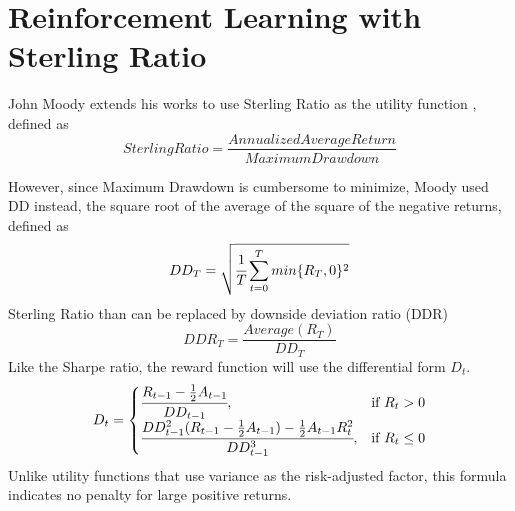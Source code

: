 \section{Reinforcement Learning with Sterling Ratio}
John Moody extends his works to use  Sterling Ratio as the utility function \cite{moody1998performance}, defined as 
\[
Sterling Ratio=\frac{Annualized Average Return}{Maximum Drawdown}
\]

However, since Maximum Drawdown is cumbersome to minimize, Moody used DD instead, the square root of the average of the
square of the negative returns, defined as
\[
DD_T = \sqrt{\cfrac{1}{T}\sum_{t=0}^{T}{min\{R_T,0\}^2}}
\]
Sterling Ratio than can be replaced by downside deviation ratio (DDR)
\[
DDR_T = \frac{Average(R_T)}{DD_T}
\]
Like the Sharpe ratio, the reward function will use the differential form \(D_t\).
\[
D_t = 
\begin{cases}
    \cfrac{R_{t-1} -\frac{1}{2}A_{t-1}}{DD_{t-1}},&\text{if  }R_t > 0\\
    \cfrac{DD_{t-1}^2 (R_{t-1}-\frac{1}{2}A_{t-1})  -\frac{1}{2}A_{t-1} R_t^2}{DD_{t-1}^3},&\text{if  }R_t \leq 0
\end{cases}
\]
Unlike utility functions that use variance as the risk-adjusted factor, this formula indicates no penalty for large positive returns. 